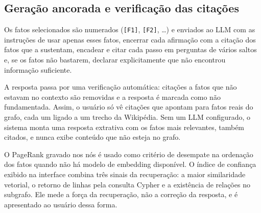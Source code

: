 \subsection{Geração ancorada e verificação das citações}

Os fatos selecionados são numerados (\texttt{[F1]}, \texttt{[F2]}, \ldots) e enviados ao LLM com as instruções de usar apenas esses fatos, encerrar cada afirmação com a citação dos fatos que a sustentam, encadear e citar cada passo em perguntas de vários saltos e, se os fatos não bastarem, declarar explicitamente que não encontrou informação suficiente.

A resposta passa por uma verificação automática: citações a fatos que não estavam no contexto são removidas e a resposta é marcada como não fundamentada. Assim, o usuário só vê citações que apontam para fatos reais do grafo, cada um ligado a um trecho da Wikipédia. Sem um LLM configurado, o sistema monta uma resposta extrativa com os fatos mais relevantes, também citados, e nunca exibe conteúdo que não esteja no grafo.

O PageRank gravado nos nós é usado como critério de desempate na ordenação dos fatos quando não há modelo de embedding disponível. O índice de confiança exibido na interface combina três sinais da recuperação: a maior similaridade vetorial, o retorno de linhas pela consulta Cypher e a existência de relações no subgrafo. Ele mede a força da recuperação, não a correção da resposta, e é apresentado ao usuário dessa forma.
